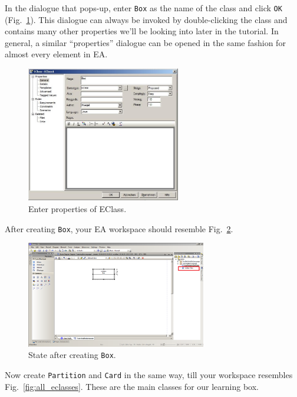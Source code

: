 In the dialogue that pops-up, enter \texttt{Box} as the name of the class and
click \texttt{OK} (Fig.~\ref{fig:eclass_properties}).  This dialogue can
always be invoked by double-clicking the class and contains many other
properties we'll be looking into later in the tutorial.  In general, a similar
``properties'' dialogue can be opened in the same fashion for almost every
element in EA.

\begin{figure}[htbp]
	\centering
  \includegraphics[width=0.6\textwidth]{pics/memBoxBilder/memBox08.png}
	\caption{Enter properties of EClass.}
	\label{fig:eclass_properties}
\end{figure}

After creating \texttt{Box}, your EA workspace should resemble
Fig.~\ref{fig:eclass_completed}. 

\begin{figure}[htbp]
	\centering
  \includegraphics[width=0.7\textwidth]{pics/memBoxBilder/memBox09.png}
	\caption{State after creating \texttt{Box}.}
	\label{fig:eclass_completed}
\end{figure}


Now create \texttt{Partition} and \texttt{Card} in the same way, till your
workspace resembles Fig.~\ref{fig:all_eclasses}.  These are the main classes for
our learning box.

